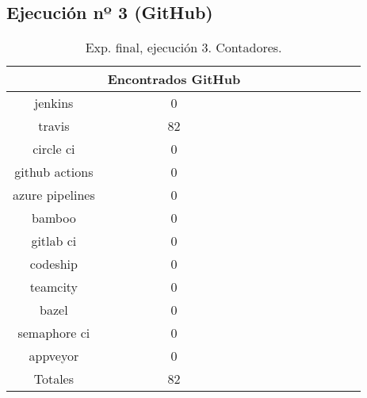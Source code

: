 \begin{table}
\begin{footnotesize}
\begin{tabular}{ccccccccccc}
 \end{tabular}
\end{footnotesize}

\end{table}

\newpage

\subsection{Ejecución nº 3 (GitHub)}
\begin{table}[h]
  \centering
  \caption{Exp. final, ejecución 3. Contadores.}
  \label{tab:tabla_f3_1}

\begin{footnotesize}
\renewcommand{\arraystretch}{1.5} %
\begin{tabular}{ccccccccccc}
  \hline
  {} &  Encontrados GitHub \\
  \hline
  jenkins         &                   0 \\
  travis          &                  82 \\
  circle ci       &                   0 \\
  github actions  &                   0 \\
  azure pipelines &                   0 \\
  bamboo          &                   0 \\
  gitlab ci       &                   0 \\
  codeship        &                   0 \\
  teamcity        &                   0 \\
  bazel           &                   0 \\
  semaphore ci    &                   0 \\
  appveyor        &                   0 \\
  \hline
  Totales         &                  82 \\
 \end{tabular}
\end{footnotesize}

\end{table}

